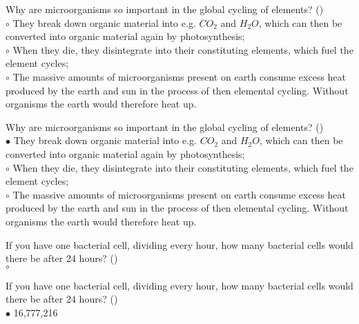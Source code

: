 \documentclass[]{beamer}
\begin{document}
\begin{frame}[shrink] {}
\addtocounter{questions}{1}
\color{blue}
Why are microorganisms so important in the global cycling of elements? ()\\
\color{black}
\setlength{\parindent}{-0.4cm}
{\color{red}$\circ$} They break down organic material into e.g. $CO_2$ and $H_2O$, which can
then be converted into organic material again by photosynthesis;\\
{\color{red}$\circ$} When they die, they disintegrate into their constituting elements,
which fuel the element cycles;\\
{\color{red}$\circ$} The massive amounts of microorganisms present on earth
consume excess heat produced by the earth and sun in the process of
then elemental cycling. Without organisms the earth would therefore heat up.
\end{frame}
\begin{frame}[shrink] {}
\addtocounter{answers}{1}
\color{blue}
Why are microorganisms so important in the global cycling of elements? ()\\
\color{black}
\setlength{\parindent}{-0.4cm}
{\color{red}$\bullet$} They break down organic material into e.g. $CO_2$ and $H_2O$, which can
then be converted into organic material again by photosynthesis;\\
{\color{red}$\circ$} When they die, they disintegrate into their constituting elements,
which fuel the element cycles;\\
{\color{red}$\circ$} The massive amounts of microorganisms present on earth
consume excess heat produced by the earth and sun in the process of
then elemental cycling. Without organisms the earth would therefore heat up.
\end{frame}

\begin{frame}[shrink] {}
\addtocounter{questions}{1}
\color{blue}
If you have one bacterial cell, dividing every hour, how many bacterial
cells would there be after 24 hours? ()\\
\color{black}
\setlength{\parindent}{-0.4cm}
{\color{red}$\circ$}\\
\end{frame}
\begin{frame}[shrink] {}
\addtocounter{answers}{1}
\color{blue}
If you have one bacterial cell, dividing every hour, how many bacterial
cells would there be after 24 hours? ()\\
\color{black}
\setlength{\parindent}{-0.4cm}
{\color{red}$\bullet$} 16,777,216
\end{frame}
\end{document}
